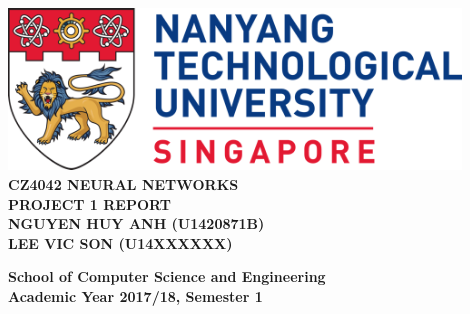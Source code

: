 \documentclass[11pt]{report}
\begin{document}
\begin{titlepage}
    \begin{center}
    
    \includegraphics[width=0.9\textwidth]{images/ntu_logo.png}
    \\[6cm]
    
    \uppercase{
    \textbf{CZ4042 Neural Networks}\\
    \textbf{Project 1 Report}
    \\[3cm]
    \textbf{Nguyen Huy Anh (U1420871B)}\\
    \textbf{Lee Vic Son (U14XXXXXX)}
    }
    
    \vfill
    
    \textbf{School of Computer Science and Engineering}
    \\
    \textbf{Academic Year 2017/18, Semester 1}
    
    \end{center}
\end{titlepage}


\end{document}
